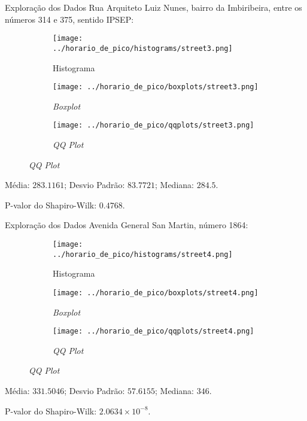 \begin{frame}{Exploração dos Dados}
Rua Arquiteto Luiz Nunes, bairro da Imbiribeira, entre os números 314 e 375,
sentido IPSEP:
\begin{figure}
	\centering
	\begin{subfigure}{.33\textwidth}
		\centering
		\texttt{[image: ../horario\_de\_pico/histograms/street3.png]}
		\caption*{Histograma}
	\end{subfigure}%
	\begin{subfigure}{.33\textwidth}
		\centering
		\texttt{[image: ../horario\_de\_pico/boxplots/street3.png]}
		\caption*{\textit{Boxplot}}
	\end{subfigure}
	\begin{subfigure}{.32\textwidth}
		\centering
		\texttt{[image: ../horario\_de\_pico/qqplots/street3.png]}
		\caption*{\textit{QQ Plot}}
	\end{subfigure}
\end{figure}
Média: $283.1161$; Desvio Padrão: $83.7721$; Mediana: $284.5$.

P-valor do Shapiro-Wilk: $0.4768$.
\end{frame}

\begin{frame}{Exploração dos Dados}
Avenida General San Martin, número 1864:
\vskip 0.05cm
\begin{figure}
	\centering
	\begin{subfigure}{.33\textwidth}
		\centering
		\texttt{[image: ../horario\_de\_pico/histograms/street4.png]}
		\caption*{Histograma}
	\end{subfigure}%
	\begin{subfigure}{.33\textwidth}
		\centering
		\texttt{[image: ../horario\_de\_pico/boxplots/street4.png]}
		\caption*{\textit{Boxplot}}
	\end{subfigure}
	\begin{subfigure}{.32\textwidth}
		\centering
		\texttt{[image: ../horario\_de\_pico/qqplots/street4.png]}
		\caption*{\textit{QQ Plot}}
	\end{subfigure}
\end{figure}
\vskip 0.05cm
Média: $331.5046$; Desvio Padrão: $57.6155$; Mediana: $346$.

P-valor do Shapiro-Wilk: $2.0634 \times 10^{-8}$.
\end{frame}

